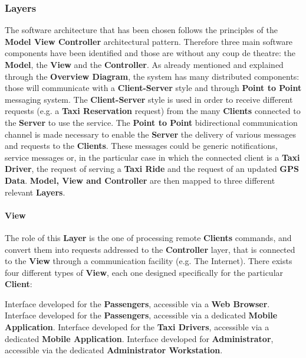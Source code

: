 \subsubsection{Layers}
The software architecture that has been chosen follows the principles of the \textbf{Model View Controller} architectural pattern.
Therefore three main software components have been identified and those are without any coup de theatre: the \textbf{Model}, the \textbf{View} and the \textbf{Controller}.
As already mentioned and explained through the \textbf{Overview Diagram}, the system has many distributed components: those will communicate with a \textbf{Client-Server} style and through \textbf{Point to Point} messaging system.
The \textbf{Client-Server} style is used in order to receive different requests (e.g. a \textbf{Taxi Reservation} request) from the many \textbf{Clients} connected to the \textbf{Server} to use the service.
The \textbf{Point to Point} bidirectional communication channel is made necessary to enable the \textbf{Server} the delivery of various messages and requests to the \textbf{Clients}.
These messages could be generic notifications, service messages or, in the particular case in which the connected client is a \textbf{Taxi Driver}, the request of serving a \textbf{Taxi Ride} and the request of an updated \textbf{GPS Data}.
\textbf{Model, View and Controller} are then mapped to three different relevant \textbf{Layers}.
%
\paragraph{View}
The role of this \textbf{Layer} is the one of processing remote \textbf{Clients} commands, and convert them into requests addressed to the \textbf{Controller} layer, that is connected to the \textbf{View} through a communication facility (e.g. The Internet).
There exists four different types of \textbf{View}, each one designed specifically for the particular \textbf{Client}:
\begin{itemize}
	 Interface developed for the \textbf{Passengers}, accessible via a \textbf{Web Browser}.
	 Interface developed for the \textbf{Passengers}, accessible via a dedicated \textbf{Mobile Application}.
	 Interface developed for the \textbf{Taxi Drivers}, accessible via a dedicated \textbf{Mobile Application}.
	 Interface developed for \myTaxiService{} \textbf{Administrator}, accessible via the dedicated \textbf{Administrator Workstation}.
\end{itemize}
%
